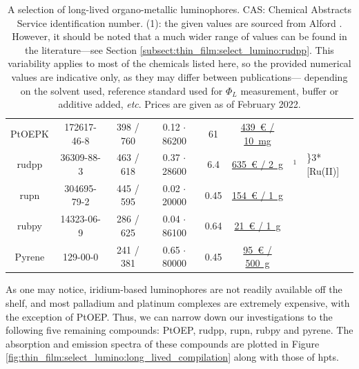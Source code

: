 \begin{table}
{\begin{tabular}{c|c|c|c|c|c|cl}
			PtOEPK & 172617-46-8 & 398 / 760 & 0.12 $\cdot$ 86200 & 61 & \href{https://web.archive.org/web/20220204135427/https://www.porphyrin-systems.de/octaethylporphyrins}{439~\euro{} / 10~mg} & \cite{papkovsky1995, mills1997_porphyrin} \\ \parthline
			\gls{rudpp} & 36309-88-3 & 463 / 618 & 0.37 $\cdot$ 28600 & 6.4 & \href{https://web.archive.org/web/20220204145614/https://www.alfa.com/en/catalog/044123/}{635~\euro{} / 2~g} & \cite{alford1985}$^1$ & \hspace{0.0em}\rdelim\}{3}{*}[Ru(II)]\\ \parthline
			\gls{rupn} & 304695-79-2 & 445 / 595 & 0.02 $\cdot$ 20000 & 0.45 & \href{http://archive.today/2022.02.04-152603/https://www.carbosynth.com/carbosynth/website.nsf/(w-productdisplay)/5C2ABB2E26359101802586A90014C75C}{154~\euro{} / 1~g} & \cite{alford1985} \\ \parthline
			\gls{rubpy} & 14323-06-9 & 286 / 625 & 0.04 $\cdot$ 86100 & 0.64 & \href{https://web.archive.org/web/20220211150558/https://www.ambeed.com/products/50525-27-4.html}{21~\euro{} / 1~g} & \cite{vanhouten1976, muller2012, fluodb_tugraz} \\ \parthline
			Pyrene & 129-00-0 & 241 / 381 & 0.65 $\cdot$ 80000 & 0.45 & \href{https://web.archive.org/web/20220211155425/https://www.chemscene.com/129-00-0.html}{95~\euro{} / 500~g} & \cite{molecular_fluorescence_app, fluodb_maxplanck}
		\end{tabular}
	}
	\caption[A selection of long-lived organo-metallic luminophores.]{A selection of long-lived organo-metallic luminophores. CAS: Chemical Abstracts Service identification number. (1): the given values are sourced from Alford \etal{}\cite{alford1985}. However, it should be noted that a much wider range of values can be found in the literature---see Section \ref{subsect:thin_film:select_lumino:rudpp}. This variability applies to most of the chemicals listed here, so the provided numerical values are indicative only, as they may differ between publications---\eg{} depending on the solvent used, reference standard used for $\Phi_L$ measurement, buffer or additive added, \emph{etc}. Prices are given as of February 2022.}
	\label{table:thin_film:select_lumino:ref_fluo_list}
\end{table}

As one may notice, iridium-based luminophores are not readily available off the shelf, and most palladium and platinum complexes are extremely expensive, with the exception of PtOEP. Thus, we can narrow down our investigations to the following five remaining compounds: PtOEP, \gls{rudpp}, \gls{rupn}, \gls{rubpy} and pyrene. The absorption and emission spectra of these compounds are plotted in Figure \ref{fig:thin_film:select_lumino:long_lived_compilation} along with those of \gls{hpts}.

